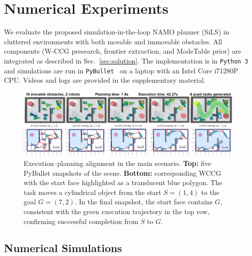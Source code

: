 \section{Numerical Experiments}
\label{sec:experiments}
We evaluate the proposed simulation-in-the-loop NAMO planner (SiLS)
in cluttered environments with both movable and immovable obstacles.
All components (W-CCG presearch, frontier extraction, and ModeTable prior)
are integrated as described in Sec.~\ref{sec:solution}.
The implementation is in \texttt{Python~3} and simulations are run in
\texttt{PyBullet}~\cite{coumans2019} on a laptop with an Intel
Core i7\textendash1280P CPU. Videos and logs are provided in the
supplementary material.

\begin{figure}[t!]
  \centering
  \includegraphics[width=1\linewidth]{figures/sim_exp.png}
  \vspace{-2mm}
\caption{Execution--planning alignment in the main scenario. 
\textbf{Top:} five PyBullet snapshots of the scene. 
\textbf{Bottom:} corresponding WCCG with the start face highlighted as a translucent blue polygon.
The task moves a cylindrical object from the start \(S=(1,4)\) to the goal \(G=(7,2)\). 
In the final snapshot, the start face contains \(G\), 
consistent with the green execution trajectory in the top row, 
confirming successful completion from \(S\) to \(G\). 
}
\end{figure}


\subsection{Numerical Simulations}
\label{subsec:sim}

